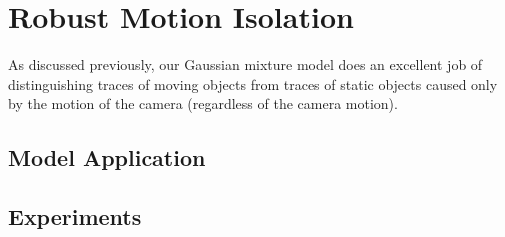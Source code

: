 \section{Robust Motion Isolation} 

As discussed previously, our Gaussian mixture model does an excellent job of
distinguishing traces of moving objects from traces of static objects caused
only by the motion of the camera (regardless of the camera motion).   

\subsection{Model Application} %
\label{sub:Model Application}


\subsection{Experiments} %
\label{sub:Experiments}

